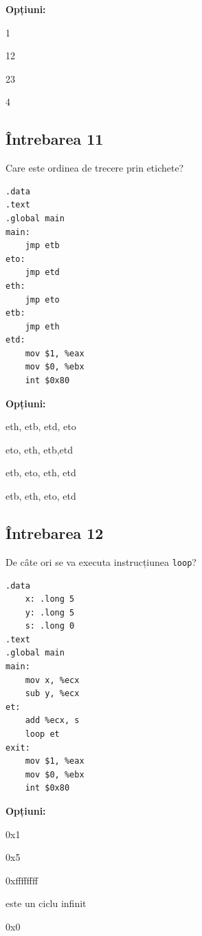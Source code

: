 \documentclass[12pt,a4paper]{article}
\begin{document}
\textbf{Opțiuni:}
\begin{itemize*}
    \item 1
    \item 12
    \item 23
    \item 4 
\end{itemize*}

\subsection*{Întrebarea 11}
Care este ordinea de trecere prin etichete?
\begin{lstlisting}[language=x86asm, caption={Cod Sursa (Lab 3.2)}]
.data
.text
.global main
main:
    jmp etb
eto:
    jmp etd
eth:
    jmp eto
etb:
    jmp eth
etd:
    mov $1, %eax
    mov $0, %ebx
    int $0x80
\end{lstlisting}

\textbf{Opțiuni:}
\begin{itemize*}
    \item eth, etb, etd, eto
    \item eto, eth, etb,etd
    \item etb, eto, eth, etd
    \item etb, eth, eto, etd 
\end{itemize*}

\subsection*{Întrebarea 12}
De câte ori se va executa instrucțiunea \texttt{loop}?
\begin{lstlisting}[language=x86asm, caption={Cod Sursa (Lab 3.2)}]
.data
    x: .long 5
    y: .long 5
    s: .long 0
.text
.global main
main:
    mov x, %ecx
    sub y, %ecx
et:
    add %ecx, s
    loop et
exit:
    mov $1, %eax
    mov $0, %ebx
    int $0x80
\end{lstlisting}

\textbf{Opțiuni:}
\begin{itemize*}
    \item 0x1
    \item 0x5
    \item 0xffffffff
    \item este un ciclu infinit
    \item 0x0 
\end{itemize*}

\end{document}
